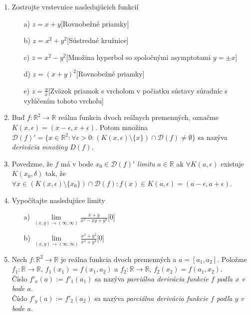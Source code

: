 \begin{enumerate}
\item Zostrojte vrstevnice nasledujúcich funkcií

\begin{enumerate}
\item[a)]{$z=x+y$}\hspace{\fill}[Rovnobežné priamky]
\item[b)]{$z=x^2+y^2$}\hspace{\fill}[Sústredné kružnice]
\item[c)]{$z=x^2-y^2$}\hspace{\fill}[Množina hyperbol so spoločnými asymptotami $y=\pm x$]
\item[d)]{$z=(x+y)^2$}\hspace{\fill}[Rovnobežné priamky]
\item[e)]{$z=\frac{y}{x}$}\hspace{\fill}[Zväzok priamok s vrcholom v počiatku sústavy súradníc s vylúčením tohoto vrcholu]
\end{enumerate}

\item Buď $f:\mathbb{R}^2 \to \mathbb{R}$ reálna funkcia dvoch reálnych premenných, označme $K(x, \epsilon)=(x-\epsilon, x+\epsilon)$. Potom množina $\mathcal{D}(f)'=\{x \in \mathbb{R}^2: \forall \epsilon>0: (K(x,\epsilon)\setminus \{x\}) \cap \mathcal{D}(f) \neq \emptyset \}$ sa nazýva \textit{derivácia množiny $D(f)$.}

\item Povedzme, že $f$ má v bode $x_0 \in \mathcal{D}(f)'$ \textit{limitu} $a \in \mathbb{R}$ ak $\forall K(a,\epsilon)$ existuje $K(x_0,\delta)$ tak, že $\forall x \in (K(x,\epsilon) \setminus \{x_0\})\cap \mathcal{D}(f):f(x) \in K(a, \epsilon)=(a-\epsilon, a+\epsilon)$.

\item Vypočítajte nasledujúce limity

\begin{enumerate}
\item[a)]{$ \lim \limits_{(x,y) \to (\infty,\infty)} \frac{x+y}{x^2-xy+y^2} $}\hspace{\fill}[0]
\item[b)]{$ \lim \limits_{(x,y) \to (\infty,\infty)} \frac{x^2+y^2}{x^4+y^4} $}\hspace{\fill}[0]
\end{enumerate}

\item Nech $f:\mathbb{R}^2 \to \mathbb{R}$ je reálna funkcia dvoch premenných a $a=[a_1,a_2]$. Položme $f_1:\mathbb{R}\to \mathbb{R}$, $f_1(x_1)=f(x_1,a_2)$ a $f_2:\mathbb{R}\to \mathbb{R}$, $f_2(x_2)=f(a_1,x_2)$. \\
Číslo $f'_x(a):=f'_1(a_1)$ sa nazýva \textit{parciálna derivácia funkcie $f$ podľa $x$ v bode $a$}. \\
Číslo $f'_y(a):=f'_2(a_2)$ sa nazýva \textit{parciálna derivácia funkcie $f$ podľa $y$ v bode $a$}. 



\end{enumerate}
